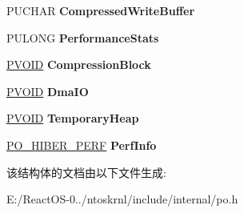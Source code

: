 \begin{DoxyCompactItemize}
\item 
\mbox{\label{struct___p_o_p___h_i_b_e_r___c_o_n_t_e_x_t_ad1bc451222ce5f0eb461396cc6be7abd}} 
P\+U\+C\+H\+AR {\bfseries Compressed\+Write\+Buffer}
\item 
\mbox{\label{struct___p_o_p___h_i_b_e_r___c_o_n_t_e_x_t_a7c8a51df9e5cad25301103451703d10e}} 
P\+U\+L\+O\+NG {\bfseries Performance\+Stats}
\item 
\mbox{\label{struct___p_o_p___h_i_b_e_r___c_o_n_t_e_x_t_a9a1dd18251dfdb9abc8ba33f5384a1e7}} 
\hyperlink{interfacevoid}{P\+V\+O\+ID} {\bfseries Compression\+Block}
\item 
\mbox{\label{struct___p_o_p___h_i_b_e_r___c_o_n_t_e_x_t_acd1ae607a00b500709bcfd565b7a4117}} 
\hyperlink{interfacevoid}{P\+V\+O\+ID} {\bfseries Dma\+IO}
\item 
\mbox{\label{struct___p_o_p___h_i_b_e_r___c_o_n_t_e_x_t_a6304af4a7502940da1ad4dcb781b2185}} 
\hyperlink{interfacevoid}{P\+V\+O\+ID} {\bfseries Temporary\+Heap}
\item 
\mbox{\label{struct___p_o_p___h_i_b_e_r___c_o_n_t_e_x_t_acb2fb431ac6b051090d0483862461534}} 
\hyperlink{struct___p_o___h_i_b_e_r___p_e_r_f}{P\+O\+\_\+\+H\+I\+B\+E\+R\+\_\+\+P\+E\+RF} {\bfseries Perf\+Info}
\end{DoxyCompactItemize}


该结构体的文档由以下文件生成\+:\begin{DoxyCompactItemize}
\item 
E\+:/\+React\+O\+S-\/0../ntoskrnl/include/internal/po.\+h\end{DoxyCompactItemize}
